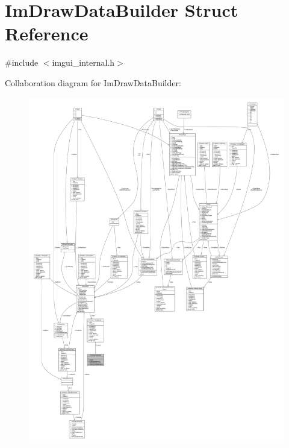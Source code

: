 \hypertarget{structImDrawDataBuilder}{}\section{Im\+Draw\+Data\+Builder Struct Reference}
\label{structImDrawDataBuilder}


{\ttfamily \#include $<$imgui\+\_\+internal.\+h$>$}



Collaboration diagram for Im\+Draw\+Data\+Builder\+:
\nopagebreak
\begin{figure}[H]
\begin{center}
\leavevmode
\includegraphics[width=350pt]{structImDrawDataBuilder__coll__graph}
\end{center}
\end{figure}
